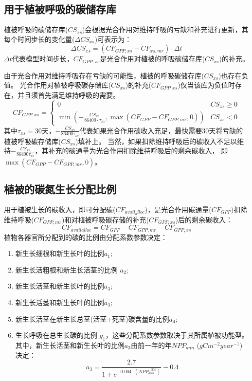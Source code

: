 \subsection{用于植被呼吸的碳储存库}
植被呼吸的碳储存库($CS_{xs}$)会根据光合作用对维持呼吸的亏缺和补充进行更新，其每个时间步长的变化量($\Delta CS_{xs}$)可表示为：
\begin{equation}
\Delta CS_{xs}=\left(CF_{GPP, xs}-CF_{xs, mr}\right) \cdot \Delta t
\end{equation}
$\Delta t$代表模型时间步长，$CF_{GPP,xs}$是光合作用对植被的呼吸碳储存库($CS_{xs}$)的补充。

由于光合作用对维持呼吸存在亏缺的可能性，植被的呼吸碳储存库($CS_{xs}$)也存在负值。
光合作用对植被呼吸碳存储库($CS_{xs}$)的补充($CF_{GPP,xs}$)仅当该库为负值时存在，并且须首先满足维持呼吸的需要。
\begin{equation}
CF_{GPP, xs}=\left\{\begin{array}{ll}0 & CS_{xs} \geq 0 \\ \min \left(-\frac{CS_{xs}}{86400 \cdot \tau_{xs}}, \max \left(CF_{GPP}-CF_{GPP, mr}, 0\right)\right) & CS_{xs}<0\end{array}\right.
\end{equation}
其中$\tau_{xs}=30$天，$-\frac{CS_{xs}}{86400 \tau_{xs}}$代表如果光合作用碳收入充足，最快需要30天将亏缺的植被呼吸碳存储库($CS_{xs}$)填补上。
当然，如果扣除维持呼吸后的碳收入不足以维持$-\frac{CS_{xs}}{86400 \tau_{xs}}$，其补充的碳通量为光合作用扣除维持呼吸后的剩余碳收入，
即$\max{\left(CF_{GPP}-CF_{GPP,mr},0\right)}$。


\subsection{植被的碳氮生长分配比例}
用于植被生长的碳收入，即可分配碳($CF_{avail_alloc}$)，是光合作用碳通量($CF_{GPP}$)扣除维持呼吸($CF_{GPP,mr}$)和对植被呼吸碳存储的补充($CF_{GPP,xs}$)后的剩余碳收入：
\begin{equation}
CF_{ {availalloc }}=CF_{GPP}-CF_{GPP, mr}-CF_{GPP, xs}
\end{equation}
植物各器官所分配到的碳的比例由分配系数参数决定：
\begin{enumerate}
  \item 新生长细根和新生长叶的比例$a_1$; 
  \item 新生长活粗根和新生长活茎的比例 $a_2$;
  \item 新生长活茎和新生长叶的比例$a_3$;
  \item 新生长活茎和新生长叶的比例$a_3$;
  \item 新生长活茎在新生长总茎(活茎+死茎)碳含量的比例$a_4$;
  \item 生长呼吸在总生长碳的比例 $g_1$，这些分配系数参数取决于其所属植被功能型。其中，新生长活茎和新生长叶的比例$a_3$由前一年的年$NPP_{ann}$ ($g C m^{-2} year^{-1}$)决定：
    \begin{equation}
      a_{3}=\frac{2.7}{1+e^{-0.004 \cdot\left(NPP_{ann}^{-300}\right)}}-0.4
    \end{equation}
\end{enumerate}

